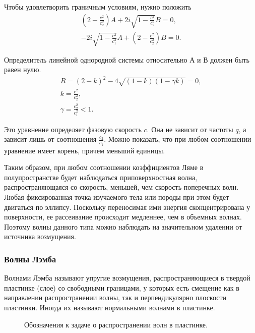 Чтобы удовлетворить граничным условиям, нужно положить
\begin{eqnarray}
(2-\frac{c^2}{c_2^2})A + 2i\sqrt{1-\frac{c^2}{c_2^2}}B = 0, \nonumber\\
-2i\sqrt{1-\frac{c^2}{c_1^2}}A + (2-\frac{c^2}{c_2^2})B = 0.
\end{eqnarray}

Определитель линейной однородной системы относительно А и В должен быть равен нулю.
\begin{eqnarray}
R = (2-k)^2 - 4\sqrt{(1-k)(1-\gamma k)} = 0, \nonumber\\
k = \frac{c^2}{c_2^2}, \nonumber\\
\gamma = \frac{c_2^2}{c_1^2} < 1.
\end{eqnarray}

Это уравнение определяет фазовую скорость $c$. Она не зависит от частоты $q$, а зависит лишь от соотношения $\frac{c_2}{c_1}$. Можно показать, что при любом соотношении уравнение имеет корень, причем меньший единицы.

Таким образом, при любом соотношении коэффициентов Ляме в полупространстве будет наблюдаться приповерхностная волна, распространяющаяся со скорость, меньшей, чем скорость поперечных волн. Любая фиксированная точка изучаемого тела или породы при этом будет двигаться по эллипсу. Поскольку переносимая ими энергия сконцентрирована у поверхности, ее рассеивание происходит медленнее, чем в объемных волнах. Поэтому волны данного типа можно наблюдать на значительном удалении от источника возмущения.


\subsubsection{Волны Лэмба}

Волнами Лэмба называют упругие возмущения, распространяющиеся в твердой пластинке (слое) со свободными границами, у которых есть смещение как в направлении распространении волны, так и перпендикулярно плоскости пластинки. Иногда их называют нормальными волнами в пластинке.

\begin{figure}[h]
\caption{Обозначения к задаче о распространении волн в пластинке.}
\end{figure}

